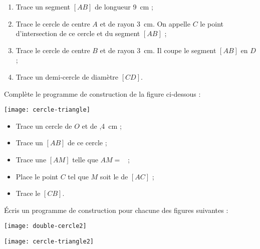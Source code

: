\begin{exercice}
\begin{enumerate}
 \item Trace un segment $[AB]$ de longueur 9 cm ;
 \item Trace le cercle de centre $A$ et de rayon 3 cm. On appelle $C$ le point d'intersection de ce cercle et du segment $[AB]$ ;
 \item Trace le cercle de centre $B$ et de rayon 3 cm. Il coupe le segment $[AB]$ en $D$ ;
 \item Trace un demi‑cercle de diamètre $[CD]$.
 \end{enumerate}
\end{exercice}


\begin{exercice}
Complète le programme de construction de la figure ci‑dessous :
\begin{center}  \texttt{[image: cercle-triangle]} \end{center}
\begin{itemize}
 \item Trace un cercle de \dotfill $O$ et de ,4 cm ;
\vspace{.4em}
 \item Trace un \dotfill $[AB]$ de ce cercle ;
\vspace{.4em}
 \item Trace une \dotfill $[AM]$ telle que $AM =$  \dotfill ;
\vspace{.4em}
 \item Place le point $C$ tel que $M$ soit le  \dotfill de $[AC]$ ;
\vspace{.4em}
 \item Trace le  \dotfill $[CB]$.
 \end{itemize}
\end{exercice}


\begin{exercice}
Écris un programme de construction pour chacune des figures suivantes :

\begin{colenumerate}{1}
 \item 
 \begin{center}
 \texttt{[image: double-cercle2]}
 \end{center}
 \item 
\begin{center}
\texttt{[image: cercle-triangle2]}
\end{center}
 \end{colenumerate}
\end{exercice}







